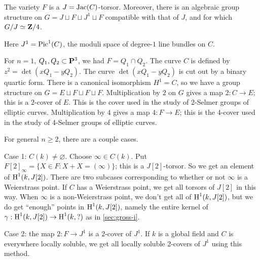 \begin{theo}
The variety $F$ is a $J=\operatorname{Jac}(C)$-torsor. Moreover, there is an algebraic 
group structure on $G=J\sqcup F\sqcup J^1\sqcup F$ compatible with that of 
$J$, and for which $G/J\simeq \mathbf{Z}/4$. 
\end{theo}


Here $J^1=\operatorname{Pic}^1(C)$, the moduli space of degree-$1$ line bundles on $C$. 

For $n=1$, $Q_1,Q_2\subset \mathbf{P}^3$, we had $F=Q_1\cap Q_2$. The curve $C$ is 
defined by $z^2=\det(x Q_1-y Q_2)$. The curve $\det(x Q_1-y Q_2)$ is cut out 
by a binary quartic form. There is a canonical isomorphism $H^1=C$, so we have 
a group structure on $G=E\sqcup F\sqcup F\sqcup F$. Multiplication by $2$ on 
$G$ gives a map $2:C\to E$; this is a $2$-cover of $E$. This is the cover used 
in the study of 2-Selmer groups of elliptic curves. Multiplication by $4$ gives 
a map $4:F\to E$; this is the $4$-cover used in the study of 4-Selmer groups of 
elliptic curves. 

For general $n\geqslant 2$, there are a couple cases. 

Case 1: $C(k)\ne\varnothing$. Choose $\infty\in C(k)$. Put 
$F[2]_\infty = \{X\in F:X+X=(\infty)\}$; this is a $J[2]$-torsor. So we get an 
element of $\operatorname{H}^1(k, J[2])$. There are two subcases 
corresponding to whether or not $\infty$ is a Weierstrass point. If $C$ has a 
Weierstrass point, we get all torsors of $J[2]$ in this way. When $\infty$ is a 
non-Weierstrass point, we don't get all of $\operatorname{H}^1(k,J[2])$, but we do get 
``enough'' points in $\operatorname{H}^1(k,J[2])$, namely the entire kernel of 
$\gamma:\operatorname{H}^1(k,J[2]) \to \operatorname{H}^1(k,?)$ as in \autoref{sec:gross-i}. 

Case 2: the map $2:F\to J^1$ is a $2$-cover of $J^1$. If $k$ is a global field 
and $C$ is everywhere locally soluble, we get all locally soluble 2-covers of 
$J^1$ using this method. 




